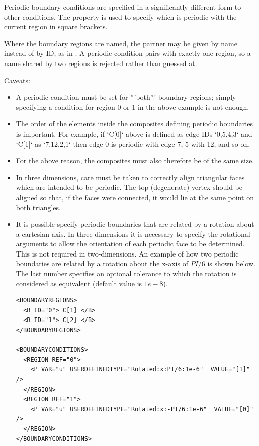 Periodic boundary conditions are specified in a significantly different form to
other conditions. The  property is used to specify which
 is periodic with the current region in square brackets.

Where the boundary regions are named, the partner may be given by name instead
of by ID, as in . A periodic condition pairs with
exactly one region, so a name shared by two regions is rejected rather than
guessed at.

Caveats:
\begin{itemize}
\item A periodic condition must be set for '''both''' boundary regions; simply
 specifying a condition for region 0 or 1 in the above example is not enough.
\item The order of the elements inside the composites defining periodic
boundaries is important. For example, if `C[0]` above is defined as edge IDs 
`{0,5,4,3}` and `C[1]` as `{7,12,2,1}` then edge 0 is periodic with edge 7, 5 
with 12, and so on.
\item For the above reason, the composites must also therefore be of the same
size.
\item In three dimensions, care must be taken to correctly align triangular
faces which are intended to be periodic. The top (degenerate) vertex should be 
aligned so that, if the faces were connected, it would lie at the same point on 
both triangles.

\item It is possible specify periodic boundaries that are related by a
  rotation about a cartesian axis. In three-dimensions it is necessary
  to specify the rotational arguments to allow the orientation of each
  periodic face to be determined. This is not required in
  two-dimensions. An example of how two periodic boundaries are
  related by a rotation about the x-axis of $PI/6$ is shown below. The
  last number specifies an optional tolerance to which the rotation is
  considered as equivalent (default value is $1e-8$).
  
  \begin{lstlisting}[style=XMLStyle]
<BOUNDARYREGIONS>
  <B ID="0"> C[1] </B>
  <B ID="1"> C[2] </B>
</BOUNDARYREGIONS>

<BOUNDARYCONDITIONS>
  <REGION REF="0">
    <P VAR="u" USERDEFINEDTYPE="Rotated:x:PI/6:1e-6"  VALUE="[1]" />
  </REGION>
  <REGION REF="1">
    <P VAR="u" USERDEFINEDTYPE="Rotated:x:-PI/6:1e-6"  VALUE="[0]" />
  </REGION>
</BOUNDARYCONDITIONS>
\end{lstlisting}


\end{itemize}

